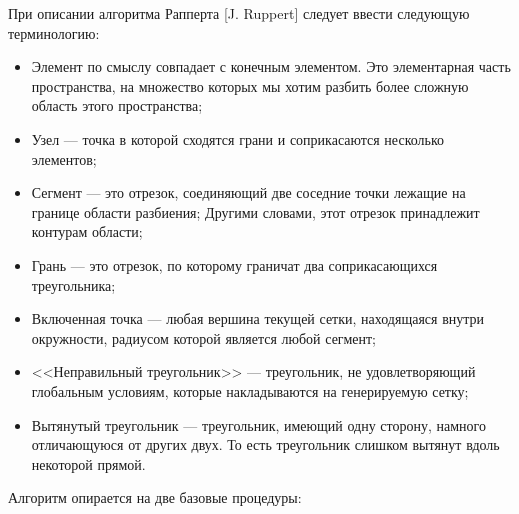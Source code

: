 \documentclass[14pt]{extreport}
\begin{document}
При описании алгоритма Рапперта [J. Ruppert] следует ввести следующую терминологию:
\begin{itemize}
\item Элемент по смыслу совпадает с конечным элементом. Это элементарная часть пространства, на множество которых мы хотим разбить более сложную область этого пространства;

\item Узел — точка в которой сходятся грани и соприкасаются несколько элементов;

\item Сегмент — это отрезок, соединяющий две соседние точки лежащие на границе области разбиения; Другими словами, этот отрезок принадлежит контурам области;

\item Грань — это отрезок, по которому граничат два соприкасающихся треугольника;

\item Включенная точка — любая вершина текущей сетки, находящаяся внутри окружности, радиусом которой является любой сегмент;

\item <<Неправильный треугольник>> — треугольник, не удовлетворяющий глобальным условиям, которые накладываются на генерируемую сетку;

\item Вытянутый треугольник — треугольник, имеющий одну сторону, намного отличающуюся от других двух. То есть треугольник слишком вытянут вдоль некоторой прямой.
\end{itemize}

Алгоритм опирается на две базовые процедуры: 
\end{document}
